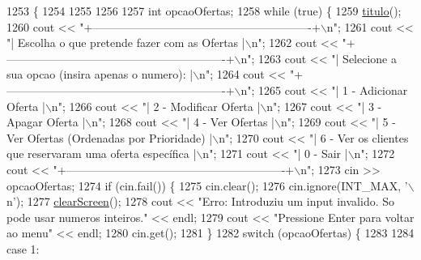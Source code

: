 \begin{DoxyCode}
1253                           \{
1254 
1255 
1256 
1257     \textcolor{keywordtype}{int} opcaoOfertas;
1258     \textcolor{keywordflow}{while} (\textcolor{keyword}{true}) \{
1259         \hyperlink{classEmpresa_ad79f7196a8ce7256771cbd7b9542155c}{titulo}();
1260         cout << \textcolor{stringliteral}{"+----------------------------------------------------------+\(\backslash\)n"};
1261         cout << \textcolor{stringliteral}{"| Escolha o que pretende fazer com as Ofertas              |\(\backslash\)n"};
1262         cout << \textcolor{stringliteral}{"+----------------------------------------------------------+\(\backslash\)n"};
1263         cout << \textcolor{stringliteral}{"| Selecione a sua opcao (insira apenas o numero):          |\(\backslash\)n"};
1264         cout << \textcolor{stringliteral}{"+----------------------------------------------------------+\(\backslash\)n"};
1265         cout << \textcolor{stringliteral}{"| 1 - Adicionar Oferta                                     |\(\backslash\)n"};
1266         cout << \textcolor{stringliteral}{"| 2 - Modificar Oferta                                     |\(\backslash\)n"};
1267         cout << \textcolor{stringliteral}{"| 3 - Apagar Oferta                                        |\(\backslash\)n"};
1268         cout << \textcolor{stringliteral}{"| 4 - Ver Ofertas                                          |\(\backslash\)n"};
1269         cout << \textcolor{stringliteral}{"| 5 - Ver Ofertas (Ordenadas por Prioridade)               |\(\backslash\)n"};
1270         cout << \textcolor{stringliteral}{"| 6 - Ver os clientes que reservaram uma oferta específica |\(\backslash\)n"};
1271         cout << \textcolor{stringliteral}{"| 0 - Sair                                                 |\(\backslash\)n"};
1272         cout << \textcolor{stringliteral}{"+----------------------------------------------------------+\(\backslash\)n"};
1273         cin >> opcaoOfertas;
1274         \textcolor{keywordflow}{if} (cin.fail()) \{
1275             cin.clear();
1276             cin.ignore(INT\_MAX, \textcolor{charliteral}{'\(\backslash\)n'});
1277             \hyperlink{menu_8h_aceb70c1ed7e11f0863a868704f02214b}{clearScreen}();
1278             cout << \textcolor{stringliteral}{"Erro: Introduziu um input invalido. So pode usar numeros inteiros."} << endl;
1279             cout << \textcolor{stringliteral}{"Pressione Enter para voltar ao menu"} << endl;
1280             cin.get();
1281         \}
1282         \textcolor{keywordflow}{switch} (opcaoOfertas) \{
1283 
1284         \textcolor{keywordflow}{case} 1:

\end{DoxyCode}
